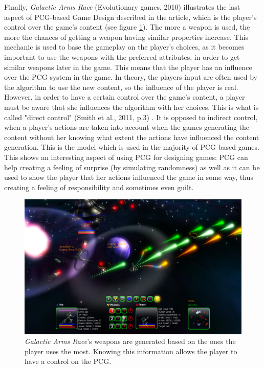Finally, \textit{Galactic Arms Race} (Evolutionary games, 2010) \cite{game:gar} illustrates the last aspect of PCG-based Game Design described in the article, which is the player's control over the game's content (see figure \ref{fig:GAR}). The more a weapon is used, the more the chances of getting a weapon having similar properties increase. This mechanic is used to base the gameplay on the player's choices, as it becomes important to use the weapons with the preferred attributes, in order to get similar weapons later in the game. This means that the player has an influence over the PCG system in the game. In theory, the players input are often used by the algorithm to use the new content, so the influence of the player is real. However, in order to have a certain control over the game's content, a player must be aware that she influences the algorithm with her choices. This is what is called "direct control" (Smith et al., 2011, p.3) \cite{pdf:pcgbased}. It is opposed to indirect control, when a player's actions are taken into account when the games generating the content without her knowing what extent the actions have influenced the content generation. This is the model which is used in the majority of PCG-based games. This shows an interesting aspect of using PCG for designing games: PCG can help creating a feeling of surprise (by simulating randomness) as well as it can be used to show the player that her actions influenced the game in some way, thus creating a feeling of responsibility and sometimes even guilt.

\begin{figure}[!ht]
    \centering
    \includegraphics[scale=0.2]{Images/GAR.jpg}
    \caption{\textit{Galactic Arms Race}'s weapons are generated based on the ones the player uses the most. Knowing this information allows the player to have a control on the PCG\cite{pic:gar}.}
    \label{fig:GAR}
\end{figure}

